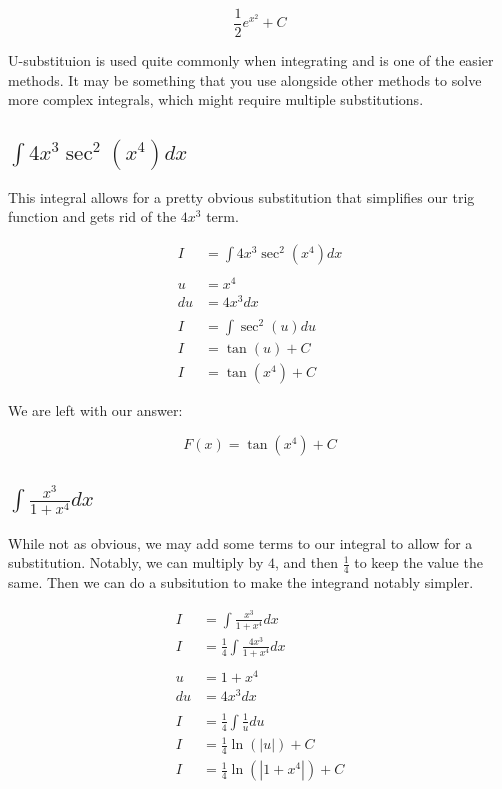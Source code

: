 \documentclass[12pt]{article}
\begin{document}
$$
    \frac{1}{2} e^{x^2} + C
$$

U-substituion is used quite commonly when integrating and is one of the easier methods.
It may be something that you use alongside other methods to solve more complex integrals, which might require multiple substitutions.

\subsection{$\int 4x^3 \sec^2(x^4) dx$}

This integral allows for a pretty obvious substitution that simplifies our trig function and gets rid of the $4x^3$ term.


\begin{align}
    I  & = \int 4x^3 \sec^2(x^4) dx \\
    \nonumber                       \\
    u  & = x^4                      \\
    du & = 4x^3 dx                  \\
    \nonumber                       \\
    I  & = \int \sec^2(u) du        \\
    I  & = \tan(u) + C              \\
    I  & = \tan(x^4) + C
\end{align}


We are left with our answer:

$$
    F(x) = \tan(x^4) + C
$$

\subsection{$\int \frac{x^3}{1+x^4} dx$}

While not as obvious, we may add some terms to our integral to allow for a substitution. Notably, we can multiply by $4$, and then $\frac{1}{4}$ to keep the value the same. Then we can do a subsitution to make the integrand notably simpler.


\begin{align}
    I  & = \int \frac{x^3}{1+x^4} dx              \\
    I  & = \frac{1}{4} \int \frac{4x^3}{1+x^4} dx \\
    \nonumber                                     \\
    u  & = 1+x^4                                  \\
    du & = 4x^3 dx                                \\
    \nonumber                                     \\
    I  & = \frac{1}{4} \int \frac{1}{u} du        \\
    I  & = \frac{1}{4} \ln(|u|) + C               \\
    I  & = \frac{1}{4} \ln(|1+x^4|) + C
\end{align}
\end{document}
